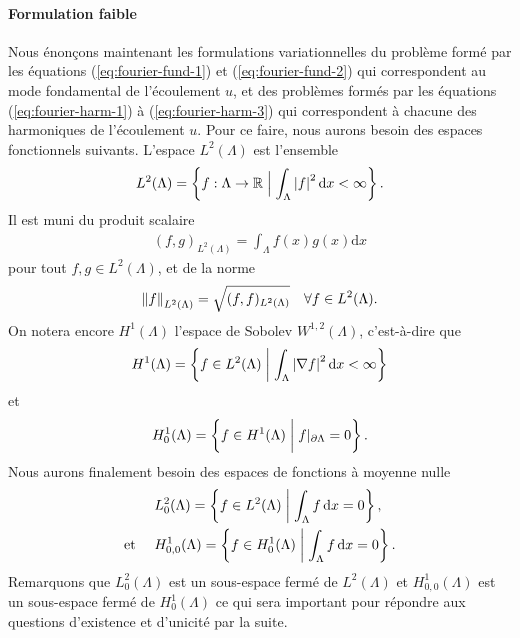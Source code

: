 \paragraph{Formulation faible}\label{sec:stokes-fourier-weak}
Nous énonçons maintenant les formulations variationnelles du problème
formé par les équations (\ref{eq:fourier-fund-1}) et
(\ref{eq:fourier-fund-2}) qui correspondent au mode fondamental de
l'écoulement $u$, et des problèmes formés par les équations
(\ref{eq:fourier-harm-1}) à (\ref{eq:fourier-harm-3}) qui
correspondent à chacune des harmoniques de l'écoulement $u$. Pour ce
faire, nous aurons besoin des espaces fonctionnels suivants. L'espace
$L^2(\Lambda)$ est l'ensemble
\begin{align}
  L^2(\Lambda) = \left\{ f:\Lambda\to\mathbb R \mathrel{\Big|} \int_\Lambda
    \left\lvert f \right\rvert^2\mathrm dx < \infty \right\}.
\end{align}
Il est muni du produit scalaire
\begin{align}
  (f, g)_{L^2(\Lambda)} = \int_\Lambda f(x)g(x)\mathrm dx
\end{align}
pour tout $f, g\in L^2(\Lambda)$, et de la norme
\begin{align}
  \left\lVert f \right\rVert_{L^2(\Lambda)} = \sqrt{(f, f)_{L^2(\Lambda)}}\quad\forall f\in L^2(\Lambda).
\end{align}
On notera encore $H^1(\Lambda)$ l'espace de Sobolev
$W^{1,2}(\Lambda)$, c'est-à-dire que
\begin{align}
  H^1(\Lambda) = \left\{ f\in L^2(\Lambda)\mathrel{\bigg|} \int_\Lambda
    \left\lvert \nabla f \right\rvert^2 \mathrm dx < \infty \right\}
\end{align}
et
\begin{align}
  H^1_0(\Lambda) = \left\{ f \in H^1(\Lambda) \mathrel{\bigg|}
    f|_{\partial \Lambda} = 0 \right\}.
\end{align}
Nous aurons finalement besoin des espaces de fonctions à moyenne nulle
\begin{align}
  &L^2_0(\Lambda) = \left\{ f\in L^2(\Lambda)\mathrel{\bigg|}
    \int_\Lambda f \,\mathrm dx = 0 \right\},\\
  \text{et }\quad &H^1_{0,0}(\Lambda) = \left\{ f\in H^1_0(\Lambda)\mathrel{\bigg|}
    \int_\Lambda f \,\mathrm dx = 0 \right\}.
\end{align}
Remarquons que $L^2_0(\Lambda)$ est un sous-espace fermé de
$L^2(\Lambda)$ et $H^1_{0,0}(\Lambda)$ est un sous-espace fermé de
$H^1_0(\Lambda)$ ce qui sera important pour répondre aux questions
d'existence et d'unicité par la suite.

